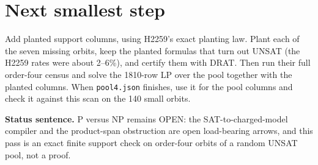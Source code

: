 \documentclass[11pt]{article}
\begin{document}
\section*{Next smallest step}
Add planted support columns, using H2259's exact planting law. Plant each of the seven missing orbits, keep the planted formulas that turn out UNSAT (the H2259 rates were about 2--6\%), and certify them with DRAT. Then run their full order-four census and solve the 1810-row LP over the pool together with the planted columns. When \texttt{pool4.json} finishes, use it for the pool columns and check it against this scan on the 140 small orbits.

\bigskip
\noindent\textbf{Status sentence.} P versus NP remains OPEN: the SAT-to-charged-model compiler and the product-span obstruction are open load-bearing arrows, and this pass is an exact finite support check on order-four orbits of a random UNSAT pool, not a proof.
\end{document}
